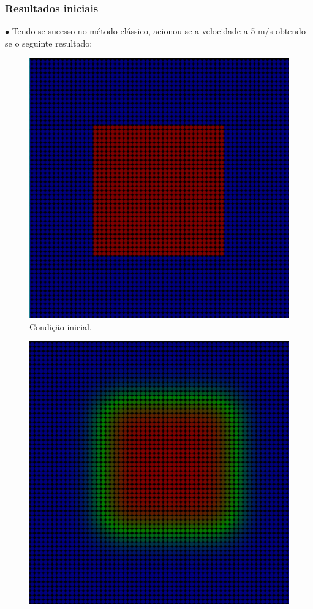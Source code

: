 \documentclass[xcolor=dvipsnames,10pt,aspectratio=169]{beamer}
\begin{document}
	\begin{frame}
	\frametitle{Resultados iniciais}
	
	$\bullet$ Tendo-se sucesso no método clássico, acionou-se a velocidade a 5 m/s obtendo-se o seguinte resultado:
	
	
	\begin{minipage}[h!]{0.30\textwidth}
		\begin{figure}[h!]
			\centering
			\includegraphics[trim = {1cm 1cm 1cm 1cm}, clip , angle=0, scale=0.3]{sucesso_!}
			\caption{Condição inicial.}
		\end{figure}
	\end{minipage}
	\begin{minipage}[h!]{0.30\textwidth}
		\begin{figure}[h!]
			\centering
			\includegraphics[trim = {1cm 1cm 1cm 1cm}, clip , angle=0, scale=0.3]{sucesso_velocidade_2}

\end{figure}
\end{minipage}
\end{frame}
\end{document}
